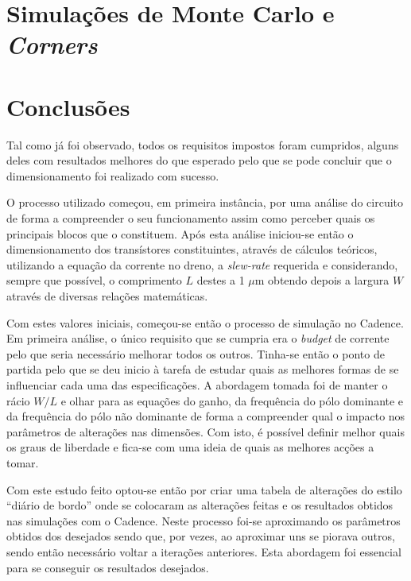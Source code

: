 \documentclass[11pt]{article}
\numberwithin{equation}{section}
\begin{document}
\pagebreak

\section{Simulações de Monte Carlo e \textit{Corners}}


\pagebreak

\section{Conclusões}

Tal como já foi observado, todos os requisitos impostos foram cumpridos, alguns deles com resultados melhores do que esperado pelo que se pode concluir que o dimensionamento foi realizado com sucesso.

O processo utilizado começou, em primeira instância, por uma análise do circuito de forma a compreender o seu funcionamento assim como perceber quais os principais blocos que o constituem. Após esta análise iniciou-se então o dimensionamento dos transístores constituintes, através de cálculos teóricos, utilizando a equação da corrente no dreno, a \textit{slew-rate} requerida e considerando, sempre que possível, o comprimento $L$ destes a 1 $\mu$m obtendo depois a largura $W$ através de diversas relações matemáticas.

Com estes valores iniciais, começou-se então o processo de simulação no Cadence. Em primeira análise, o único requisito que se cumpria era o \textit{budget} de corrente pelo que seria necessário melhorar todos os outros.
Tinha-se então o ponto de partida pelo que se deu inicio à tarefa de estudar quais as melhores formas de se influenciar cada uma das especificações. A abordagem tomada foi de manter o rácio $W/L$ e olhar para as equações do ganho, da frequência do pólo dominante e da frequência do pólo não dominante de forma a compreender qual o impacto nos parâmetros de alterações nas dimensões. Com isto, é possível definir melhor quais os graus de liberdade e fica-se com uma ideia de quais as melhores acções a tomar.

Com este estudo feito optou-se então por criar uma tabela de alterações do estilo ``diário de bordo'' onde se colocaram as alterações feitas e os resultados obtidos nas simulações com o Cadence. Neste processo foi-se aproximando os parâmetros obtidos dos desejados sendo que, por vezes, ao aproximar uns se piorava outros, sendo então necessário voltar a iterações anteriores. Esta abordagem foi essencial para se conseguir os resultados desejados.
\end{document}
